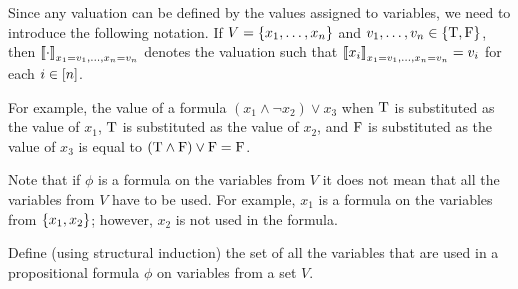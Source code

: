 Since any valuation can be defined by the values assigned to variables, we need
to introduce the following notation.
If $V = \set{x_1, \dots, x_n}$ and $v_1, \dots, v_n \in \set{\ltrue, \lfalse}$,
then $\left\llbracket {\cdot} \right\rrbracket_{x_1 = v_1, \dots, x_n = v_n}$ denotes the valuation
such that $\left\llbracket {x_i} \right\rrbracket_{x_1 = v_1, \dots, x_n = v_n} = v_i$ for each
$i \in {[{n}]}$.


For example, the value of a formula $(x_1 \land \lnot x_2) \lor x_3$ when
$\text{T}$ is substituted as the value of $x_1$,
$\text{T}$ is substituted as the value of $x_2$,
and $\text{F}$ is substituted as the value of $x_3$ is equal to
$(\text{T} \land \text{F}) \lor \text{F} = \text{F}$.

Note that if $\phi$ is a formula on the variables from $V$ it does not mean that
all the variables from $V$ have to be used.
For example, $x_1$ is a formula on the variables from $\set{x_1, x_2}$; however,
$x_2$ is not used in the formula.

\begin{exercise}
  Define (using structural induction) the set of all the variables that are
  used in a propositional formula $\phi$ on variables from a set $V$.
\end{exercise}


